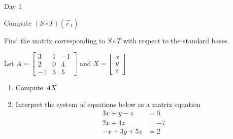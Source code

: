 \begin{applicationActivities}{Day 1}
\begin{activity}
  Compute $(S \circ T)(\vec{e}_1)$
\end{activity}

\begin{activity}
  Find the matrix corresponding to $S \circ T$ with respect to the standard bases.
\end{activity}

\begin{activity}
Let $A=\begin{bmatrix} 3 & 1 & -1 \\ 2 & 0 & 4 \\ -1 & 3 & 5 \end{bmatrix}$ and $X=\begin{bmatrix} x \\ y \\ z \end{bmatrix}$
\begin{enumerate}
\item Compute $AX$
\item Interpret the system of equations below as a matrix equation
\begin{align*}
3x+y-z &= 5 \\ 2x+4z &= -7 \\ -x+3y+5z &=2
\end{align*}
\end{enumerate}
\end{activity}

\end{applicationActivities}

